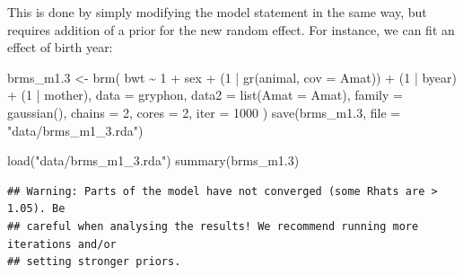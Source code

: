 \documentclass[
  12pt,
]{book}
\newenvironment{Shaded}{\begin{snugshade}}{\end{snugshade}}
\newcommand{\AttributeTok}[1]{\textcolor[rgb]{0.77,0.63,0.00}{#1}}
\newcommand{\DecValTok}[1]{\textcolor[rgb]{0.00,0.00,0.81}{#1}}
\newcommand{\FloatTok}[1]{\textcolor[rgb]{0.00,0.00,0.81}{#1}}
\newcommand{\FunctionTok}[1]{\textcolor[rgb]{0.00,0.00,0.00}{#1}}
\newcommand{\NormalTok}[1]{#1}
\newcommand{\OtherTok}[1]{\textcolor[rgb]{0.56,0.35,0.01}{#1}}
\newcommand{\SpecialCharTok}[1]{\textcolor[rgb]{0.00,0.00,0.00}{#1}}
\newcommand{\StringTok}[1]{\textcolor[rgb]{0.31,0.60,0.02}{#1}}
\begin{document}
This is done by simply modifying the model statement in the same way, but requires addition of a prior for the new random effect. For instance, we can fit an effect of birth year:

\begin{Shaded}
\begin{Highlighting}[]
\NormalTok{brms\_m1}\FloatTok{.3} \OtherTok{\textless{}{-}} \FunctionTok{brm}\NormalTok{(}
\NormalTok{  bwt }\SpecialCharTok{\textasciitilde{}} \DecValTok{1} \SpecialCharTok{+}\NormalTok{ sex }\SpecialCharTok{+}\NormalTok{ (}\DecValTok{1} \SpecialCharTok{|} \FunctionTok{gr}\NormalTok{(animal, }\AttributeTok{cov =}\NormalTok{ Amat)) }\SpecialCharTok{+}\NormalTok{ (}\DecValTok{1} \SpecialCharTok{|}\NormalTok{ byear) }\SpecialCharTok{+}\NormalTok{ (}\DecValTok{1} \SpecialCharTok{|}\NormalTok{ mother),}
  \AttributeTok{data =}\NormalTok{ gryphon,}
  \AttributeTok{data2 =} \FunctionTok{list}\NormalTok{(}\AttributeTok{Amat =}\NormalTok{ Amat),}
  \AttributeTok{family =} \FunctionTok{gaussian}\NormalTok{(),}
  \AttributeTok{chains =} \DecValTok{2}\NormalTok{, }\AttributeTok{cores =} \DecValTok{2}\NormalTok{, }\AttributeTok{iter =} \DecValTok{1000}
\NormalTok{)}
\FunctionTok{save}\NormalTok{(brms\_m1}\FloatTok{.3}\NormalTok{, }\AttributeTok{file =} \StringTok{"data/brms\_m1\_3.rda"}\NormalTok{)}
\end{Highlighting}
\end{Shaded}

\begin{Shaded}
\begin{Highlighting}[]
\FunctionTok{load}\NormalTok{(}\StringTok{"data/brms\_m1\_3.rda"}\NormalTok{)}
\FunctionTok{summary}\NormalTok{(brms\_m1}\FloatTok{.3}\NormalTok{)}
\end{Highlighting}
\end{Shaded}

\begin{verbatim}
## Warning: Parts of the model have not converged (some Rhats are > 1.05). Be
## careful when analysing the results! We recommend running more iterations and/or
## setting stronger priors.
\end{verbatim}
\end{document}
